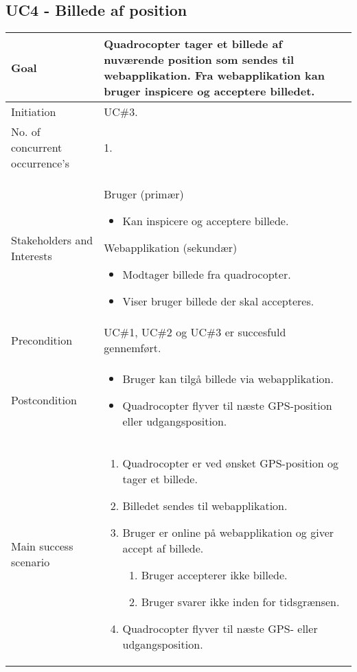 \subsection*{UC4 - Billede af position}

\begin{table}[H]
\begin{tabular}{|l|p{10cm}|}
\hline

Goal	 							& Quadrocopter tager et billede af nuværende position som sendes til webapplikation. Fra webapplikation kan bruger inspicere og acceptere billedet. \\\hline
Initiation 							& UC\#3. \\\hline
No. of concurrent occurrence’s		& 1. \\\hline
Stakeholders	and Interests			& Bruger (primær) 
										\begin{itemize}
											\item Kan inspicere og acceptere billede.
										\end{itemize} 
									  Webapplikation (sekundær)
										\begin{itemize}
											\item Modtager billede fra quadrocopter.
											\item Viser bruger billede der skal accepteres.
										\end{itemize} \\\hline
Precondition							& UC\#1, UC\#2 og UC\#3 er succesfuld gennemført. \\\hline
Postcondition						& 	\begin{itemize}
											\item Bruger kan tilgå billede via webapplikation.
											\item Quadrocopter flyver til næste GPS-position eller udgangsposition.
										\end{itemize} \\\hline
Main success scenario				&
 
									\renewcommand{\labelenumi}{\arabic{enumi}.}
									\renewcommand{\labelenumii}{\Roman{enumii}:}

									\begin{enumerate}[topsep=0.0cm, leftmargin=0.5cm]
										\item Quadrocopter er ved ønsket GPS-position og tager et billede.
										\item Billedet sendes til webapplikation.
										\item Bruger er online på webapplikation og giver accept af billede.
											\begin{enumerate}[partopsep=4cm, topsep=0cm, leftmargin=1cm]
												\item Bruger accepterer ikke billede.
												\item Bruger svarer ikke inden for tidsgrænsen.
											\end{enumerate}
										\item Quadrocopter flyver til næste GPS- eller udgangsposition.
									\end{enumerate} \\\hline	


\end{tabular}
\end{table}
